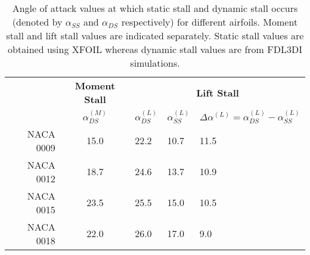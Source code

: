 \documentclass[aps,pra,preprint,groupedaddress]{revtex4-1}
\renewcommand{\=}[1]{\stackrel{#1}{=}} %
\begin{document}
\begin{table}[htb!]
\centering
\caption{Angle of attack values at which static stall and dynamic stall occurs
  (denoted by $\alpha_{SS}$ and $\alpha_{DS}$ respectively) for different
  airfoils.  Moment stall and lift stall values are indicated separately.
  Static stall values are obtained using XFOIL whereas dynamic stall values are
  from FDL3DI simulations.}
\label{tab:alpha_SSvsDS}
\begin{tabular}{r|c|l|l|l}
\multirow{2}{*}{} & \textbf{Moment Stall} & \multicolumn{3}{c}{\textbf{Lift Stall}} \\ \cline{2-5}  \cline{2-5}
                  &                   $\alpha^{(M)}_{DS}$ & $\alpha^{(L)}_{DS}$ &                   $\alpha^{(L)}_{SS}$ & $\Delta \alpha^{(L)} = \alpha^{(L)}_{DS} - \alpha^{(L)}_{SS}$  \\ \hline  \hline
        NACA 0009 & \cellcolor[HTML]{EFEFEF}15.0           &   22.2               & \cellcolor[HTML]{EFEFEF}  10.7         &    11.5                                        \\ \hline
        NACA 0012 & \cellcolor[HTML]{EFEFEF}18.7           &   24.6               & \cellcolor[HTML]{EFEFEF}  13.7         &    10.9                                        \\ \hline
        NACA 0015 & \cellcolor[HTML]{EFEFEF}23.5           &   25.5               & \cellcolor[HTML]{EFEFEF}  15.0         &    10.5                                        \\ \hline
        NACA 0018 & \cellcolor[HTML]{EFEFEF}22.0           &   26.0               & \cellcolor[HTML]{EFEFEF}  17.0         &     9.0                                        \\ \hline \hline
\end{tabular}
\end{table}

\end{document}
